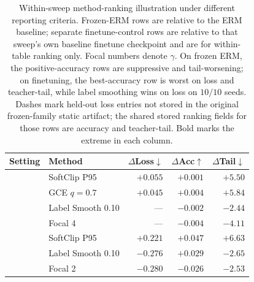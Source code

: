\begin{table}[t]
  \centering
  \small
  \begin{tabular}{@{}llrrr@{}}
    \toprule
    Setting & Method & $\Delta$Loss$\downarrow$ & $\Delta$Acc$\uparrow$ & $\Delta$Tail$\downarrow$ \\
    \midrule
    & SoftClip P95    & $+0.055$ & $+0.001$ & $\mathbf{+5.50}$ \\
    & GCE $q=0.7$     & $+0.045$ & $\mathbf{+0.004}$ & $\mathbf{+5.84}$ \\
    & Label Smooth 0.10 & --- & $-0.002$ & $-2.44$ \\
    & Focal 4         & --- & $-0.004$ & $\mathbf{-4.11}$ \\
    \midrule
      & SoftClip P95    & $+0.221$ & $\mathbf{+0.047}$ & $+6.63$ \\
      & Label Smooth 0.10 & $-0.276$ & $+0.029$ & $\mathbf{-2.65}$ \\
      & Focal 2         & $\mathbf{-0.280}$ & $-0.026$ & $-2.53$ \\
    \bottomrule
  \end{tabular}
  \caption{
    Within-sweep method-ranking illustration under different reporting criteria.
    Frozen-ERM rows are relative to the ERM baseline; separate finetune-control rows are relative to that sweep's own baseline finetune checkpoint and are for within-table ranking only.
    Focal numbers denote $\gamma$.
    On frozen ERM, the positive-accuracy rows are suppressive and tail-worsening; on finetuning, the best-accuracy row is worst on loss and teacher-tail, while label smoothing wins on loss on $10/10$ seeds.
    Dashes mark held-out loss entries not stored in the original frozen-family static artifact; the shared stored ranking fields for those rows are accuracy and teacher-tail.
    Bold marks the extreme in each column.
  }
  \label{tab:ranking-reversal}
\end{table}
